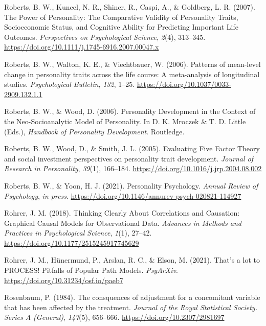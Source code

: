 \documentclass[
  english,
  man, noextraspace]{apa7}
\begin{document}
\leavevmode\hypertarget{ref-robertsPowerPersonalityComparative2007}{}%
Roberts, B. W., Kuncel, N. R., Shiner, R., Caspi, A., \& Goldberg, L. R. (2007). The Power of Personality: The Comparative Validity of Personality Traits, Socioeconomic Status, and Cognitive Ability for Predicting Important Life Outcomes. \emph{Perspectives on Psychological Science}, \emph{2}(4), 313--345. \url{https://doi.org/10.1111/j.1745-6916.2007.00047.x}

\leavevmode\hypertarget{ref-robertsPatternsMeanlevelChange2006a}{}%
Roberts, B. W., Walton, K. E., \& Viechtbauer, W. (2006). Patterns of mean-level change in personality traits across the life course: A meta-analysis of longitudinal studies. \emph{Psychological Bulletin}, \emph{132}, 1--25. \url{https://doi.org/10.1037/0033-2909.132.1.1}

\leavevmode\hypertarget{ref-robertsPersonalityDevelopmentContext2006}{}%
Roberts, B. W., \& Wood, D. (2006). Personality Development in the Context of the Neo-Socioanalytic Model of Personality. In D. K. Mroczek \& T. D. Little (Eds.), \emph{Handbook of Personality Development}. Routledge.

\leavevmode\hypertarget{ref-robertsEvaluatingFiveFactor2005}{}%
Roberts, B. W., Wood, D., \& Smith, J. L. (2005). Evaluating Five Factor Theory and social investment perspectives on personality trait development. \emph{Journal of Research in Personality}, \emph{39}(1), 166--184. \url{https://doi.org/10.1016/j.jrp.2004.08.002}

\leavevmode\hypertarget{ref-robertsPersonalityPsychology2021}{}%
Roberts, B. W., \& Yoon, H. J. (2021). Personality Psychology. \emph{Annual Review of Psychology}, \emph{in press}. \url{https://doi.org/10.1146/annurev-psych-020821-114927}

\leavevmode\hypertarget{ref-rohrerThinkingClearlyCorrelations2018}{}%
Rohrer, J. M. (2018). Thinking Clearly About Correlations and Causation: Graphical Causal Models for Observational Data. \emph{Advances in Methods and Practices in Psychological Science}, \emph{1}(1), 27--42. \url{https://doi.org/10.1177/2515245917745629}

\leavevmode\hypertarget{ref-rohrerThatLotPROCESS2021}{}%
Rohrer, J. M., Hünermund, P., Arslan, R. C., \& Elson, M. (2021). That's a lot to PROCESS! Pitfalls of Popular Path Models. \emph{PsyArXiv}. \url{https://doi.org/10.31234/osf.io/paeb7}

\leavevmode\hypertarget{ref-rosenbaumConsquencesAdjustmentConcomitant1984}{}%
Rosenbaum, P. (1984). The consquences of adjustment for a concomitant variable that has been affected by the treatment. \emph{Journal of the Royal Statistical Society. Series A (General)}, \emph{147}(5), 656--666. \url{https://doi.org/10.2307/2981697}
\end{document}
